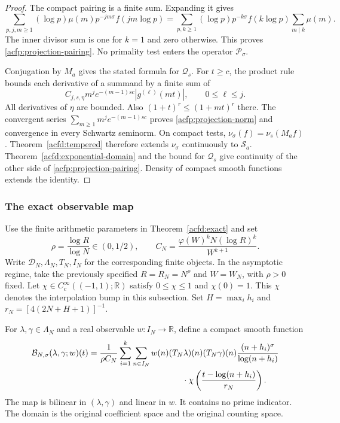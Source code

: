 \begin{proof}
The compact pairing is a finite sum.  Expanding it gives
\[
 \sum_{p,j,m\geq1}
   (\log p)\mu(m)p^{-jm\sigma}f(jm\log p)
 =\sum_{p,k\geq1}(\log p)p^{-k\sigma}f(k\log p)
                      \sum_{m\mid k}\mu(m).
\]
The inner divisor sum is one for $k=1$ and zero otherwise.
This proves \eqref{acfp:projection-pairing}.
No primality test enters the operator $\mathcal P_\sigma$.

Conjugation by $M_a$ gives the stated formula for $\mathcal Q_s$.
For $t\geq c$, the product rule bounds each derivative of a summand by
a finite sum of
\[
 C_{j,s,\eta}m^j e^{-(m-1)sc}|g^{(\ell)}(mt)|,\qquad 0\leq\ell\leq j.
\]
All derivatives of $\eta$ are bounded.
Also $(1+t)^r\leq(1+mt)^r$ there.
The convergent series $\sum_{m\geq1}m^j e^{-(m-1)sc}$ proves
\eqref{acfp:projection-norm} and convergence in every Schwartz seminorm.
On compact tests, $\nu_\sigma(f)=\nu_s(M_af)$.
Theorem~\ref{acfd:tempered} therefore extends $\nu_\sigma$ continuously
to $\mathcal S_a$.
Theorem~\ref{acfd:exponential-domain} and the bound for $\mathcal Q_s$
give continuity of the other side of \eqref{acfp:projection-pairing}.
Density of compact smooth functions extends the identity.
\end{proof}

\subsubsection{The exact observable map}

Use the finite arithmetic parameters in Theorem~\ref{acfd:exact} and set
\[
 \rho=\frac{\log R}{\log N}\in(0,1/2),\qquad
 C_N=\frac{\varphi(W)^kN(\log R)^k}{W^{k+1}}.
\]
Write $\mathcal D_N,\Lambda_N,T_N,I_N$ for the corresponding finite objects.
In the asymptotic regime, take the previously specified $R=R_N=N^\rho$
and $W=W_N$, with $\rho>0$ fixed.
Let $\chi\in C_c^\infty((-1,1);\mathbb R)$ satisfy
$0\leq\chi\leq1$ and $\chi(0)=1$.
This $\chi$ denotes the interpolation bump in this subsection.
Set $H=\max_i h_i$ and $r_N=[4(2N+H+1)]^{-1}$.

For $\lambda,\gamma\in\Lambda_N$ and a real observable
$w:I_N\to\mathbb R$, define a compact smooth function
\begin{equation}\label{acfp:observable-map}
 \begin{split}
 \mathcal B_{N,\sigma}(\lambda,\gamma;w)(t)
  ={}&\frac1{\rho C_N}
    \sum_{i=1}^k\sum_{n\in I_N}
       w(n)(T_N\lambda)(n)(T_N\gamma)(n)
       \frac{(n+h_i)^\sigma}{\log(n+h_i)}\\
     &\hspace{35mm}\cdot
       \chi\left(\frac{t-\log(n+h_i)}{r_N}\right).
 \end{split}
\end{equation}
The map is bilinear in $(\lambda,\gamma)$ and linear in $w$.
It contains no prime indicator.
The domain is the original coefficient space and the original counting space.

